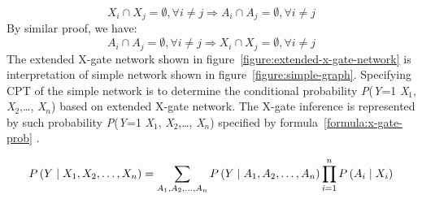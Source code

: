 \documentclass{article}
\numberwithin{equation}{section}
\numberwithin{figure}{section}
\numberwithin{table}{section}
\begin{document}
\[X_i\cap X_j=\emptyset ,\forall i\neq j\Rightarrow A_i\cap A_j=\emptyset ,\forall i\neq j\] 
By similar proof, we have:
\[A_i\cap A_j=\emptyset ,\forall i\neq j\Rightarrow X_i\cap X_j=\emptyset ,\forall i\neq j\] 
The extended X-gate network shown in figure~\ref{figure:extended-x-gate-network} is interpretation of simple network shown in figure~\ref{figure:simple-graph}. Specifying CPT of the simple network is to determine the conditional probability \textit{P}(\textit{Y}=1 {\textbar} \textit{X}${}_{1}$, \textit{X}${}_{2}$,{\dots}, \textit{X${}_{n}$}) based on extended X-gate network. The X-gate inference is represented by such probability \textit{P}(\textit{Y}=1 {\textbar} \textit{X}${}_{1}$, \textit{X}${}_{2}$,{\dots}, \textit{X${}_{n}$}) specified by formula~\ref{formula:x-gate-prob} \cite[p.~159]{neapolitan:bn}.

\begin{equation}
P\left(Y\mathrel{\left|\vphantom{Y X_1,X_2,\dots ,X_n}\right.\kern-\nulldelimiterspace}X_1,X_2,\dots ,X_n\right)=\sum_{A_1,A_2,\dots ,A_n}{P\left(Y\mathrel{\left|\vphantom{Y A_1,A_2,\dots ,A_n}\right.\kern-\nulldelimiterspace}A_1,A_2,\dots ,A_n\right)\prod^n_{i=1}{P\left(A_i\mathrel{\left|\vphantom{A_i X_i}\right.\kern-\nulldelimiterspace}X_i\right)}}
\label{formula:x-gate-prob}
\end{equation}
\end{document}
